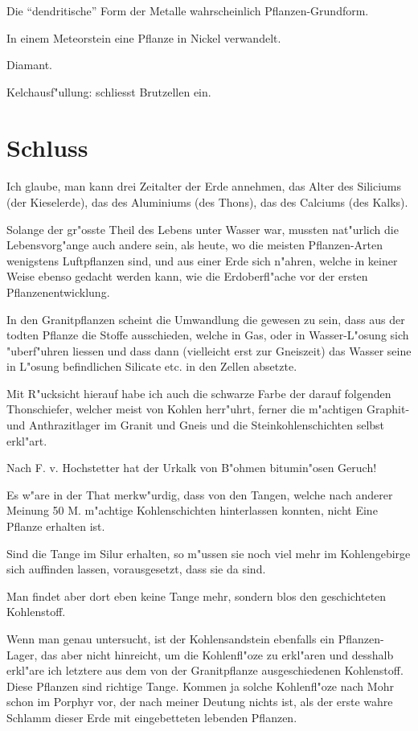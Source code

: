 \documentclass[a4paper, 11pt, oneside, german]{article}
\begin{document}
Die "`dendritische"' Form der Metalle wahrscheinlich Pflanzen-Grundform.

In einem Meteorstein eine Pflanze in Nickel verwandelt.

Diamant.

Kelchausf"ullung: schliesst Brutzellen ein.
\clearpage
\section{Schluss}
\paragraph{}
Ich glaube, man kann drei Zeitalter der Erde annehmen, das Alter des Siliciums (der Kieselerde), das des Aluminiums (des Thons), das des Calciums (des Kalks).

Solange der gr"osste Theil des Lebens unter Wasser war, mussten nat"urlich die Lebensvorg"ange auch andere sein, als heute, wo die meisten Pflanzen-Arten wenigstens Luftpflanzen sind, und aus einer Erde sich n"ahren, welche in keiner Weise ebenso gedacht werden kann, wie die Erdoberfl"ache vor der ersten Pflanzenentwicklung.

In den Granitpflanzen scheint die Umwandlung die gewesen zu sein, dass aus der todten Pflanze die Stoffe ausschieden, welche in Gas, oder in Wasser-L"osung sich "uberf"uhren liessen und dass dann (vielleicht erst zur Gneiszeit) das Wasser seine in L"osung befindlichen Silicate etc. in den Zellen absetzte.

Mit R"ucksicht hierauf habe ich auch die schwarze Farbe der darauf folgenden Thonschiefer, welcher meist von Kohlen herr"uhrt, ferner die m"achtigen Graphit- und Anthrazitlager im Granit und Gneis und die Steinkohlenschichten selbst erkl"art.

Nach F. v. Hochstetter hat der Urkalk von B"ohmen bitumin"osen Geruch!

Es w"are in der That merkw"urdig, dass von den Tangen, welche nach anderer Meinung 50 M. m"achtige Kohlenschichten hinterlassen konnten, nicht Eine Pflanze erhalten ist.

Sind die Tange im Silur erhalten, so m"ussen sie noch viel mehr im Kohlengebirge sich auffinden lassen, vorausgesetzt, dass sie da sind.

Man findet aber dort eben keine Tange mehr, sondern blos den geschichteten Kohlenstoff.

Wenn man genau untersucht, ist der Kohlensandstein ebenfalls ein Pflanzen-Lager, das aber nicht hinreicht, um die Kohlenfl"oze zu erkl"aren und desshalb erkl"are ich letztere aus dem von der Granitpflanze ausgeschiedenen Kohlenstoff. Diese Pflanzen sind richtige Tange. Kommen ja solche Kohlenfl"oze nach Mohr schon im Porphyr vor, der nach meiner Deutung nichts ist, als der erste wahre Schlamm dieser Erde mit eingebetteten lebenden Pflanzen.
\end{document}
